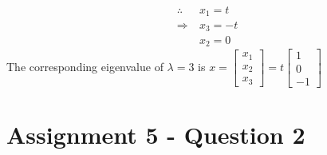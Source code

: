 \documentclass{article}
\begin{document}
$$
\begin{aligned}
\therefore \ &x_1 = t \\
\Rightarrow \ &x_3 = -t \\
&x_2 = 0
\end{aligned}
$$
The corresponding eigenvalue of $\lambda = 3$ is 
$x = \begin{bmatrix}x_1 \\ x_2 \\ x_3 \end{bmatrix} = t\begin{bmatrix}1 \\ 0 \\ -1 \end{bmatrix}$ 
\\

\section*{Assignment 5 - Question 2}
\end{document}
